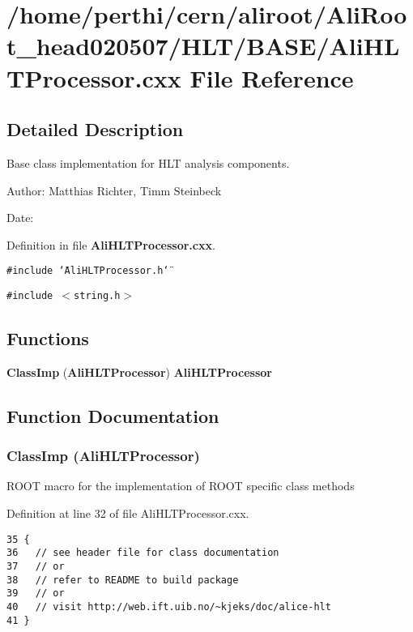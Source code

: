 \section{/home/perthi/cern/aliroot/Ali\-Root\_\-head020507/HLT/BASE/Ali\-HLTProcessor.cxx File Reference}
\label{AliHLTProcessor_8cxx}


\subsection{Detailed Description}
Base class implementation for HLT analysis components. 

\begin{Desc}
\item[Author:]Matthias Richter, Timm Steinbeck \end{Desc}
\begin{Desc}
\item[Date:]\end{Desc}


Definition in file {\bf Ali\-HLTProcessor.cxx}.

{\tt \#include \char`\"{}Ali\-HLTProcessor.h\char`\"{}}\par
{\tt \#include $<$string.h$>$}\par
\subsection*{Functions}
\begin{CompactItemize}
\item 
{\bf Class\-Imp} ({\bf Ali\-HLTProcessor}) {\bf Ali\-HLTProcessor}
\end{CompactItemize}


\subsection{Function Documentation}
\subsubsection{\setlength{\rightskip}{0pt plus 5cm}Class\-Imp ({\bf Ali\-HLTProcessor})}\label{AliHLTProcessor_8cxx_a0}


ROOT macro for the implementation of ROOT specific class methods 

Definition at line 32 of file Ali\-HLTProcessor.cxx.

\footnotesize\begin{verbatim}35 { 
36   // see header file for class documentation
37   // or
38   // refer to README to build package
39   // or
40   // visit http://web.ift.uib.no/~kjeks/doc/alice-hlt
41 }
\end{verbatim}\normalsize 


